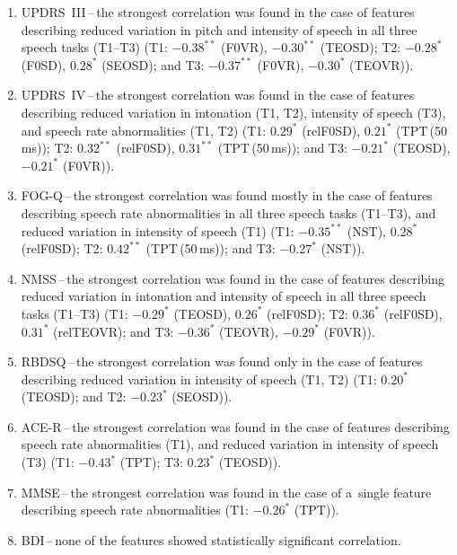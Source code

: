 \begin{enumerate}
	\item UPDRS~III\,--\,the strongest correlation was found in the case of features describing reduced variation in pitch and intensity of speech in all three speech tasks (T1--T3) (T1: $-0.38^{**}$ (F0VR), $-0.30^{**}$ (TEOSD); T2: $-0.28^{*}$ (F0SD), $0.28^{*}$ (SEOSD); and T3: $-0.37^{**}$ (F0VR), $-0.30^{*}$ (TEOVR)).
	\item UPDRS~IV\,--\,the strongest correlation was found in the case of features describing reduced variation in intonation (T1, T2), intensity of speech (T3), and speech rate abnormalities (T1, T2) (T1: $0.29^{*}$ (relF0SD), $0.21^{*}$ (TPT\,(50\,ms)); T2: $0.32^{**}$ (relF0SD), $0.31^{**}$ (TPT\,(50\,ms)); and T3: $-0.21^{*}$ (TEOSD), $-0.21^{*}$ (F0VR)).
	\item FOG-Q\,--\,the strongest correlation was found mostly in the case of features describing speech rate abnormalities in all three speech tasks (T1--T3), and reduced variation in intensity of speech (T1) (T1: $-0.35^{**}$ (NST), $0.28^{*}$ (relF0SD); T2: $0.42^{**}$ (TPT\,(50\,ms)); and T3: $-0.27^{*}$ (NST)).
	\item NMSS\,--\,the strongest correlation was found in the case of features describing reduced variation in intonation and intensity of speech in all three speech tasks (T1--T3) (T1: $-0.29^{*}$ (TEOSD), $0.26^{*}$ (relF0SD); T2: $0.36^{*}$ (relF0SD), $0.31^{*}$ (relTEOVR); and T3: $-0.36^{*}$ (TEOVR), $-0.29^{*}$ (F0VR)).
	\item RBDSQ\,--\,the strongest correlation was found only in the case of features describing reduced variation in intensity of speech (T1, T2) (T1: $0.20^{*}$ (TEOSD); and T2: $-0.23^{*}$ (SEOSD)).
	\item ACE-R\,--\,the strongest correlation was found in the case of features describing speech rate abnormalities (T1), and reduced variation in intensity of speech (T3) (T1: $-0.43^{*}$ (TPT); T3: $0.23^{*}$ (TEOSD)).
	\item MMSE\,--\,the strongest correlation was found in the case of a~single feature describing speech rate abnormalities (T1: $-0.26^{*}$ (TPT)).
	\item BDI\,--\,none of the features showed statistically significant correlation.
\end{enumerate}


